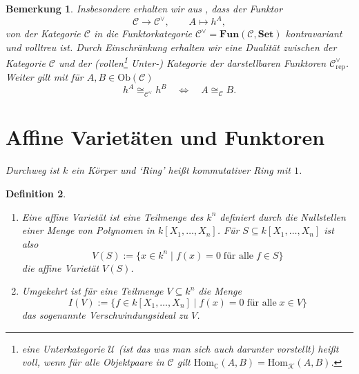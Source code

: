 \documentclass[a4paper, 11pt]{scrartcl}
\newcommand{\C}{\mathbb{C}}
\newcommand{\Hom}{\text{Hom}}
\newcommand{\Ob}{\text{Ob}}
\newcommand{\CC}{\mathcal{C}}
\theoremstyle{basicstyle}
\newtheorem{definition}{Definition}[section]
\newtheorem{bemerkung}[definition]{Bemerkung}
\begin{document}
    \begin{bemerkung}\label{bem:2}
        Insbesondere erhalten wir aus , dass der Funktor
        \[\mathcal{C} \longrightarrow \mathcal{C}^\vee, \qquad A \mapsto h^A,\]
        von der Kategorie \(\mathcal{C}\) in die Funktorkategorie \(\mathcal{C}^\vee = \textbf{Fun}(\mathcal{C}, \textbf{Set})\) kontravariant und volltreu ist. %
        Durch Einschränkung erhalten wir eine Dualität zwischen der Kategorie \(\CC\) und der (vollen\footnote[1]{eine Unterkategorie \(\mathcal{U}\) (ist das was man sich auch darunter vorstellt) heißt voll, wenn für alle Objektpaare in \(\CC\) gilt \(\Hom_{\C}(A, B) = \Hom_{\mathcal{K}}(A, B)\).} Unter-) Kategorie der darstellbaren Funktoren \(\CC_{\text{rep}}^\vee\).
        Weiter gilt mit  für \(A, B \in \Ob(\CC)\)
        \[h^A \cong_{\CC^\vee} h^B \quad\iff\quad A \cong_\CC B.\]
    \end{bemerkung}

    \newpage

    \section{Affine Varietäten und Funktoren}
    
    {\itshape Durchweg ist \(k\) ein Körper und `Ring' heißt kommutativer Ring mit \(1\).}
    
    \begin{definition}
        \begin{enumerate}
            \item Eine \emph{affine Varietät} ist eine Teilmenge des \(k^n\) definiert durch die Nullstellen einer Menge von Polynomen in \(k[X_1, \ldots, X_n]\).
                Für \(S \subseteq k[X_1, \ldots, X_n]\) ist also 
                \[V(S) := \{x \in k^n \;\vert\; f(x) = 0 \; \text{für alle}\; f \in S\}\]
                die affine Varietät \(V(S)\).

            \item Umgekehrt ist für eine Teilmenge \(V \subseteq k^n\) die Menge
                \[I(V) := \{f \in k[X_1, \ldots, X_n] \;\vert\; f(x) = 0 \;\text{für alle}\; x \in V\}\]
                das sogenannte \emph{Verschwindungsideal} zu \(V\).
        \end{enumerate}
    \end{definition}
\end{document}
